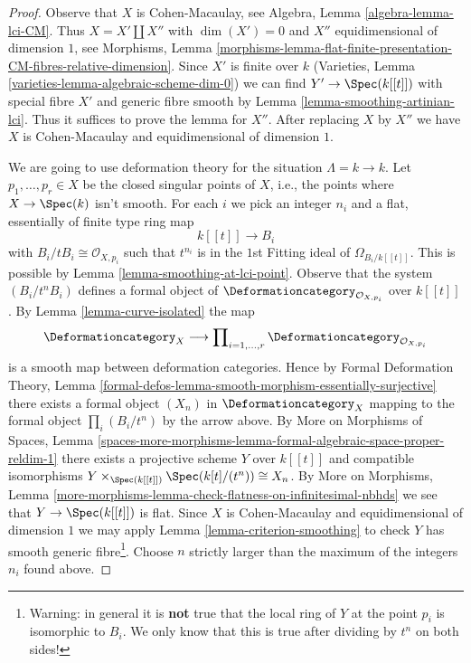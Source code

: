 \begin{proof}
Observe that $X$ is Cohen-Macaulay, see
Algebra, Lemma \ref{algebra-lemma-lci-CM}.
Thus $X = X' \amalg X''$ with $\dim(X') = 0$
and $X''$ equidimensional of dimension $1$, see Morphisms, Lemma
\ref{morphisms-lemma-flat-finite-presentation-CM-fibres-relative-dimension}.
Since $X'$ is finite over $k$ (Varieties, Lemma
\ref{varieties-lemma-algebraic-scheme-dim-0})
we can find $Y' \to \Spec(k[[t]])$ with special
fibre $X'$ and generic fibre smooth by
Lemma \ref{lemma-smoothing-artinian-lci}.
Thus it suffices to prove the lemma for $X''$.
After replacing $X$ by $X''$ we have $X$ is
Cohen-Macaulay and equidimensional of dimension $1$.

\medskip\noindent
We are going to use deformation theory for the situation $\Lambda = k \to k$.
Let $p_1, \ldots, p_r \in X$ be the closed singular points of $X$, i.e.,
the points where $X \to \Spec(k)$ isn't smooth. For each $i$ we pick
an integer $n_i$ and a flat, essentially of finite type ring map
$$
k[[t]] \longrightarrow B_i
$$
with $B_i/tB_i \cong \mathcal{O}_{X, p_i}$ such that
$t^{n_i}$ is in the $1$st Fitting ideal of $\Omega_{B_i/k[[t]]}$.
This is possible by Lemma \ref{lemma-smoothing-at-lci-point}.
Observe that the system $(B_i/t^nB_i)$ defines a formal object of
$\Deformationcategory_{\mathcal{O}_{X, p_i}}$ over $k[[t]]$.
By Lemma \ref{lemma-curve-isolated} the map
$$
\Deformationcategory_X
\longrightarrow
\prod\nolimits_{i = 1, \ldots, r} \Deformationcategory_{\mathcal{O}_{X, p_i}}
$$
is a smooth map between deformation categories. Hence by
Formal Deformation Theory, Lemma
\ref{formal-defos-lemma-smooth-morphism-essentially-surjective}
there exists a formal object $(X_n)$ in $\Deformationcategory_X$
mapping to the formal object $\prod_i (B_i/t^n)$ by the arrow above.
By More on Morphisms of Spaces, Lemma
\ref{spaces-more-morphisms-lemma-formal-algebraic-space-proper-reldim-1}
there exists a projective scheme $Y$ over $k[[t]]$ and compatible
isomorphisms $Y \times_{\Spec(k[[t]])} \Spec(k[t]/(t^n)) \cong X_n$.
By More on Morphisms, Lemma
\ref{more-morphisms-lemma-check-flatness-on-infinitesimal-nbhds}
we see that $Y \to \Spec(k[[t]])$ is flat.
Since $X$ is Cohen-Macaulay and equidimensional of dimension $1$
we may apply Lemma \ref{lemma-criterion-smoothing}
to check $Y$ has smooth generic fibre\footnote{Warning: in general it is
{\bf not} true that the local ring of $Y$ at the point
$p_i$ is isomorphic to $B_i$. We only know that this is true after
dividing by $t^n$ on both sides!}.
Choose $n$ strictly larger than the maximum of the integers $n_i$ found above.

\end{proof}
